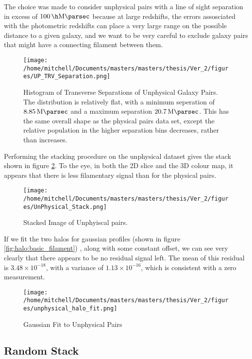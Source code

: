 The choice was made to consider unphysical pairs with a line of sight separation in excess of $\SI{100}{\per\h\mega\parsec}$ because at large redshifts, the errors assosciated with the photometric redshifts can place a very large range on the possible distance to a given galaxy, and we want to be very careful to exclude galaxy pairs that might have a connecting filament between them. 

\begin{figure}[h!]
\centering
\texttt{[image: /home/mitchell/Documents/masters/masters/thesis/Ver\_2/figures/UP\_TRV\_Separation.png]}
\caption{Histogram of Transverse Separations of Unphysical Galaxy Pairs. The distribution is relatively flat, with a minimum seperation of $\SI{8.85}{\mega\parsec}$ and a maximum separation $\SI{20.7}{\mega\parsec}$. This has the same overall shape as the physical pairs data set, except the relative population in the higher separation bins decreases, rather than increases.}
\label{fig:unphysical:transverse}
\end{figure}

Performing the stacking procedure on the unphysical dataset gives the stack shown in figure \ref{fig:unphysical:stack}. To the eye, in both the 2D slice and the 3D colour map, it appears that there is less filamentary signal than for the physical pairs. 

\begin{figure}[h!]
\centering
\texttt{[image: /home/mitchell/Documents/masters/masters/thesis/Ver\_2/figures/UnPhysical\_Stack.png]}
\caption{Stacked Image of Unphyiscal pairs.}
\label{fig:unphysical:stack}
\end{figure}

If we fit the two halos for gaussian profiles (shown in figure \ref{fig:halo:basic_filament}) , along with some constant offset, we can see very clearly that there appears to be no residual signal left. The mean of this residual is $3.48 \times 10^{-18}$, with a variance of $1.13 \times 10^{-16}$, which is consistent with a zero measurement. 


\begin{figure}[h!]
\centering
\texttt{[image: /home/mitchell/Documents/masters/masters/thesis/Ver\_2/figures/unphysical\_halo\_fit.png]}
\caption{Gaussian Fit to Unphysical Pairs}
\label{fig:unphysical:fit}
\end{figure}

\subsection{Random Stack}

